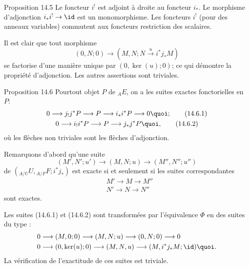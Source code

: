 \documentclass[10pt]{../fichiers-configuration-latex/smfart}
\begin{document}
\begin{enonce*}{Proposition 14.5}
Le foncteur $i^{!}$ est adjoint à droite au foncteur $i_{\ast}$. Le
morphisme d'adjonction $i_{\ast}i^{!}\rightarrow \id$ est un
monomorphisme. Les foncteurs $i^{!}$ (pour des anneaux variables)
commutent aux foncteurs restriction des scalaires.
\end{enonce*}

Il est clair que tout morphisme
$$
(0,N;0)\longrightarrow (M,N;N\xrightarrow{u}i^{\ast}j_{\ast}M)
$$
se factorise d'une manière unique par $(0,\ker(u);0)$; ce qui
démontre la propriété d'adjonction. Les autres assertions sont
triviales.

\begin{enonce*}{Proposition 14.6}
Pour\pageoriginale tout objet $P$ de ${}_AE$, on a les suites
exactes fonctorielles en $P$:
\begin{gather}
0\longrightarrow j_{!}j^{\ast}P\longrightarrow P\longrightarrow
i_{\ast}i^{\ast}P\longrightarrow 0{\quoi};\tag{14.6.1}\\
0\longrightarrow i_{!}i^{\ast}P\longrightarrow P\longrightarrow
j_{\ast}j^{\ast}P{\quoi},\tag{14.6.2}
\end{gather}
où les flèches non triviales sont les flèches d'adjonction.
\end{enonce*}

Remarquons d'abord qu'une suite
$$
(M', N'; u')\longrightarrow (M,N;u)\longrightarrow (M'',N'';u'')
$$
de $({}_{A/U}U, {}_{A/F}F; i^{\ast}j_{\ast})$ est exacte si et
seulement si les suites correspondantes
\begin{align*}
& M'\longrightarrow M\longrightarrow M''\\
& N'\longrightarrow N\longrightarrow N''
\end{align*}
sont exactes.

Les suites (14.6.1) et (14.6.2) sont transformées par
l'équivalence $\Phi$ en des suites du type :
\begin{align*}
& 0\longrightarrow (M,0;0)\longrightarrow (M,N;u)\longrightarrow
(0,N;0)\longrightarrow 0\\
& 0\longrightarrow (0,\ker(u);0)\longrightarrow
(M,N,u)\longrightarrow (M,i^{\ast}j_{\ast}M; \id){\quoi}.
\end{align*}
La vérification de l'exactitude de ces suites est triviale.

\setcounter{subsection}{6}
\end{document}
